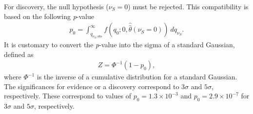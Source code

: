 For discovery, the null hypothesis ($\nu_S = 0$) must be rejected. This compatibility is based on the following \emph{p}-value
\begin{equation}
    \label{eq:pvalue_bonly}
    \begin{aligned}
        p_{0} = \int_{q_{\nu_S,obs}}^\infty f(q_0;0,\hat{\hat{\theta}}(\nu_S =0))~dq_{\nu_S}.
    \end{aligned}
\end{equation}
It is customary to convert the \emph{p}-value into the sigma of a standard Gaussian, defined as
\begin{equation}
    \label{eq:sigma}
    \begin{aligned}
    Z = \Phi^{-1}(1-p_0),
    \end{aligned}
\end{equation}
where $\Phi^{-1}$ is the inverse of a cumulative distribution for a standard Gaussian. The significances for evidence or a discovery correspond to $3\sigma$ and $5\sigma$, respectively. These correspond to values of $p_0 = 1.3 \times 10^{-3}$ and $p_0 = 2.9 \times 10^{-7}$ for $3\sigma$ and $5\sigma$, respectively.

